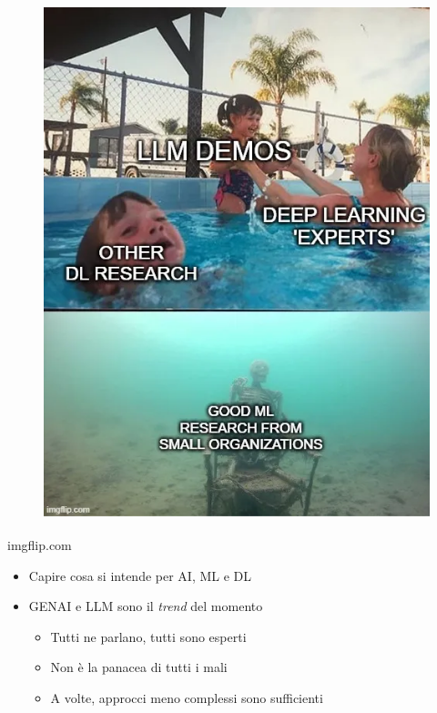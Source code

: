\begin{frame}[t]
{\begin{minipage}[b]{\textwidth}
\begin{minipage}[b]{0.33\textwidth}
\begin{figure}[ht]
                \includegraphics[width=\textwidth]{img/meme-1.png}
            \end{figure}
            \begin{flushright}
                \vspace*{-7pt}
                {\tiny\textsuperscript{\textcopyright}imgflip.com}
            \end{flushright}
        \end{minipage}
    \end{minipage}
    \begin{itemize}[leftmargin=10pt,align=right]
        \item[\alert{\faHandORight}] Capire cosa si intende per AI, ML e DL
        \item[\alert{\faHandORight}] GENAI e LLM sono il \textit{trend} del momento
        \begin{itemize}[leftmargin=10pt,align=right]
            \item[\alert{\faHandORight}] Tutti ne parlano, tutti sono esperti
            \item[\alert{\faHandORight}] \alert{Non} è la panacea di tutti i mali
            \item[\alert{\faHandORight}] A volte, approcci meno complessi sono sufficienti
        \end{itemize}
    \end{itemize}
}
\end{frame}


